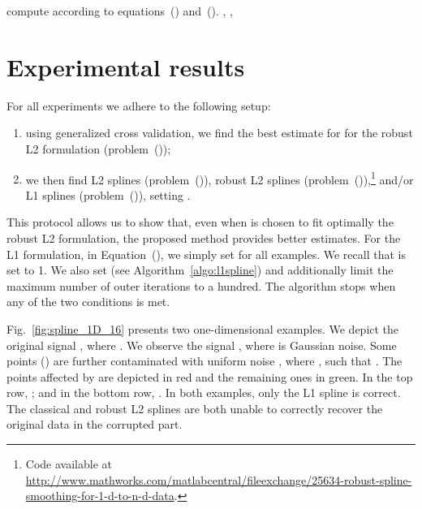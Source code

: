 \documentclass[preprint]{imsart}
\newenvironment{boxedalgorithmic}
  {\begin{lrbox}{\ieeealgbox}
   \begin{minipage}{\dimexpr\textwidth-2\fboxsep-2\fboxrule}
   \begin{algorithmic}}
  {\end{algorithmic}
   \end{minipage}
   \end{lrbox}\noindent\fbox{\usebox{\ieeealgbox}}}
\begin{document}
\begin{figure*}[t]
    \begin{boxedalgorithmic}
        \State compute  according to equations~() and~().
        \State , , 
        
        \Repeat
             
                \State 
                \State 
            \EndFor
            \State 
            \State 
        \Until{}
        \State \Return 
        \EndFunction
    \end{boxedalgorithmic}

    \caption{Pseudocode of the L1 spline for evenly spaced-data via Bregman iteration}
    \label{algo:l1spline}
\end{figure*}


\section{Experimental results}
\label{sec:results}

For all experiments we adhere to the following setup:
\begin{enumerate}
    \item using generalized cross validation, we find the best estimate  for  for the robust L2 formulation (problem~());
    \item we then find L2 splines (problem~()), robust L2 splines (problem~()),\footnote{Code available at \url{http://www.mathworks.com/matlabcentral/fileexchange/25634-robust-spline-smoothing-for-1-d-to-n-d-data}.} and/or L1 splines (problem~()), setting .
\end{enumerate}
This protocol allows us to show that, even when  is chosen to fit optimally the robust L2 formulation, the proposed method provides better estimates.
For the L1 formulation, in Equation~(), we simply set  for all examples. We recall that  is set to 1. We also set  (see Algorithm~\ref{algo:l1spline}) and additionally limit the maximum number of outer iterations to a hundred. The algorithm stops when any of the two conditions is met.

Fig.~\ref{fig:spline_1D_16} presents two one-dimensional examples. We depict the original signal , where . We observe the signal , where  is Gaussian noise.
Some points  () are further contaminated with uniform noise , where , such that . The points affected by  are depicted in red and the remaining ones in green.
In the top row, ; and in the bottom row, . In both examples, only the L1 spline is correct. The classical and robust L2 splines are both unable to correctly recover the original data in the corrupted part.
\end{document}
